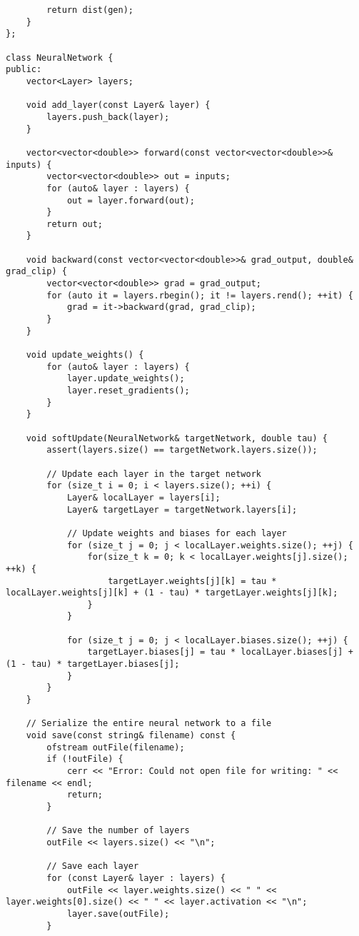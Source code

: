 \begin{verbatim}
        return dist(gen);
    }
};
 
class NeuralNetwork {
public:
    vector<Layer> layers;
 
    void add_layer(const Layer& layer) {
        layers.push_back(layer);
    }
 
    vector<vector<double>> forward(const vector<vector<double>>& inputs) {
        vector<vector<double>> out = inputs;
        for (auto& layer : layers) {
            out = layer.forward(out);
        }
        return out;
    }
 
    void backward(const vector<vector<double>>& grad_output, double& grad_clip) {
        vector<vector<double>> grad = grad_output;
        for (auto it = layers.rbegin(); it != layers.rend(); ++it) {
            grad = it->backward(grad, grad_clip);
        }
    }
 
    void update_weights() {
        for (auto& layer : layers) {
            layer.update_weights();
            layer.reset_gradients();
        }
    }
 
    void softUpdate(NeuralNetwork& targetNetwork, double tau) {
        assert(layers.size() == targetNetwork.layers.size());
 
        // Update each layer in the target network
        for (size_t i = 0; i < layers.size(); ++i) {
            Layer& localLayer = layers[i];
            Layer& targetLayer = targetNetwork.layers[i];
 
            // Update weights and biases for each layer
            for (size_t j = 0; j < localLayer.weights.size(); ++j) {
                for(size_t k = 0; k < localLayer.weights[j].size(); ++k) {
                    targetLayer.weights[j][k] = tau * localLayer.weights[j][k] + (1 - tau) * targetLayer.weights[j][k];
                }
            }
 
            for (size_t j = 0; j < localLayer.biases.size(); ++j) {
                targetLayer.biases[j] = tau * localLayer.biases[j] + (1 - tau) * targetLayer.biases[j];
            }
        }
    }
 
    // Serialize the entire neural network to a file
    void save(const string& filename) const {
        ofstream outFile(filename);
        if (!outFile) {
            cerr << "Error: Could not open file for writing: " << filename << endl;
            return;
        }
 
        // Save the number of layers
        outFile << layers.size() << "\n";
 
        // Save each layer
        for (const Layer& layer : layers) {
            outFile << layer.weights.size() << " " << layer.weights[0].size() << " " << layer.activation << "\n";
            layer.save(outFile);
        }
 

\end{verbatim}
